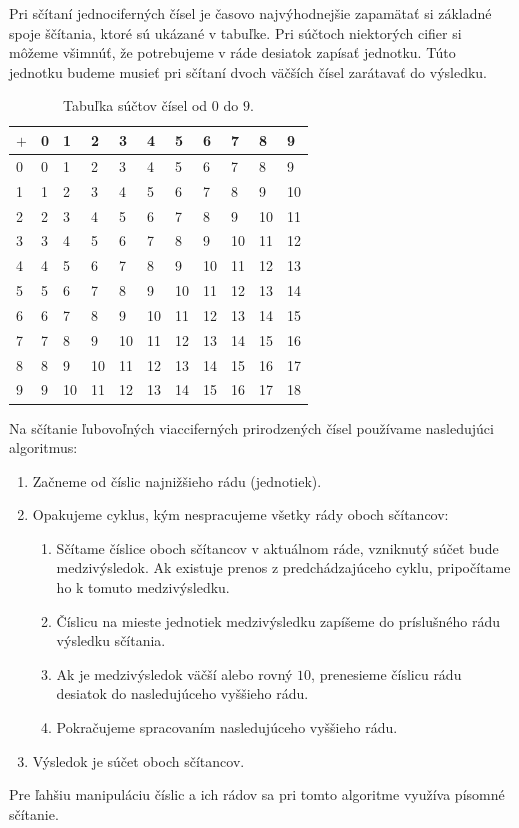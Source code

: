\documentclass{article}
\begin{document}
Pri sčítaní jednociferných čísel je časovo najvýhodnejšie zapamätať si základné spoje ščítania, ktoré sú ukázané v tabuľke. Pri súčtoch niektorých cifier si môžeme všimnúť, že potrebujeme v ráde desiatok zapísať jednotku. Túto jednotku budeme musieť pri sčítaní dvoch väčších čísel zarátavať do výsledku.
\begin{table}[H]
  \centering
  \renewcommand{\arraystretch}{1.3}
  \begin{tabular}{C|CCCCCCCCCC}
    \(+\) & 0 & 1 & 2 & 3 & 4 & 5 & 6 & 7 & 8 & 9 \\
     & 0 & 1 & 2 & 3 & 4 & 5 & 6 & 7 & 8 & 9 \\
    1 & 1 & 2 & 3 & 4 & 5 & 6 & 7 & 8 & 9 & 10 \\
    2 & 2 & 3 & 4 & 5 & 6 & 7 & 8 & 9 & 10 & 11 \\
    3 & 3 & 4 & 5 & 6 & 7 & 8 & 9 & 10 & 11 & 12 \\
    4 & 4 & 5 & 6 & 7 & 8 & 9 & 10 & 11 & 12 & 13 \\
    5 & 5 & 6 & 7 & 8 & 9 & 10 & 11 & 12 & 13 & 14 \\
    6 & 6 & 7 & 8 & 9 & 10 & 11 & 12 & 13 & 14 & 15 \\
    7 & 7 & 8 & 9 & 10 & 11 & 12 & 13 & 14 & 15 & 16 \\
    8 & 8 & 9 & 10 & 11 & 12 & 13 & 14 & 15 & 16 & 17 \\
    9 & 9 & 10 & 11 & 12 & 13 & 14 & 15 & 16 & 17 & 18 \\
  \end{tabular}
  \caption{Tabuľka súčtov čísel od \(0\) do \(9\).}
\end{table}

Na sčítanie ľubovoľných viacciferných prirodzených čísel používame nasledujúci algoritmus:
\begin{enumerate}[label=\arabic*)]
  \item Začneme od číslic najnižšieho rádu (jednotiek).
  \item Opakujeme cyklus, kým nespracujeme všetky rády oboch sčítancov:
  \begin{enumerate}
    \item Sčítame číslice oboch sčítancov v aktuálnom ráde, vzniknutý súčet bude medzivýsledok. Ak existuje prenos z predchádzajúceho cyklu, pripočítame ho k tomuto medzivýsledku.
    \item Číslicu na mieste jednotiek medzivýsledku zapíšeme do príslušného rádu výsledku sčítania.
    \item Ak je medzivýsledok väčší alebo rovný \(10\), prenesieme číslicu rádu desiatok do nasledujúceho vyššieho rádu.
    \item Pokračujeme spracovaním nasledujúceho vyššieho rádu.
  \end{enumerate}
  \item Výsledok je súčet oboch sčítancov.
\end{enumerate}
Pre ľahšiu manipuláciu číslic a ich rádov sa pri tomto algoritme využíva písomné sčítanie.
\end{document}
